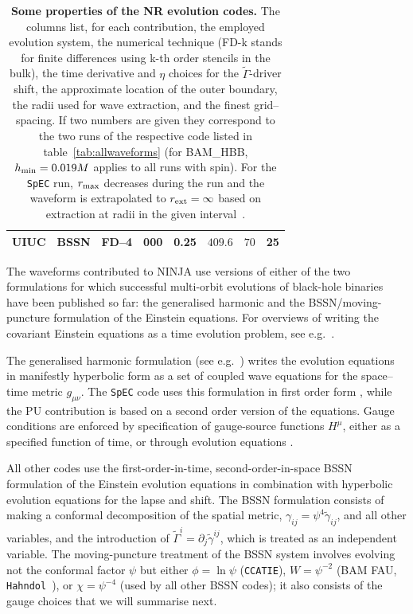 \begin{table}
\begin{center}
\begin{tabular}{|c|c|c|c|c|c|c|c|}
UIUC       & BSSN  &  FD--4         & 000 & 0.25      &  $409.6$    & $70$            & 25 \\ %

\hline
\end{tabular}
\end{center}
\caption{{\bf Some properties of the NR evolution codes.}  The columns
  list, for each contribution, the employed evolution system, the
  numerical technique (FD-k stands for finite differences using k-th
  order stencils in the bulk), the time derivative and $\eta$ choices
  for the $\tilde{\Gamma}$-driver shift, the approximate location of
  the outer boundary, the radii used for wave extraction, and the
  finest grid--spacing.  If two numbers are given they correspond to
the two runs of the respective code listed in table~\ref{tab:allwaveforms} (for BAM\_HBB, $h_{\rm min}=0.019M$ applies to all runs with spin).
For the {\tt SpEC} run, $r_{\rm max}$ decreases during the run and
the waveform is extrapolated to $r_{\rm ext}=\infty$ based
on extraction at radii in the given interval~\cite{Boyle:2007ft,Scheel:2008rj}. }
\label{tab:numparameters}
\end{table}

The waveforms contributed to NINJA use versions of either of the two
formulations for which successful multi-orbit evolutions of black-hole 
binaries have been published so far: the generalised harmonic and the
BSSN/moving-puncture formulation of the Einstein equations. For
overviews of writing the covariant Einstein equations as a time
evolution problem, see e.g.\ \cite{York1979,Wald84,Friedrich:2000qv}.

The generalised harmonic formulation (see e.g.\
\cite{Friedrich:2000qv}) writes the evolution equations in
manifestly hyperbolic form as a set of coupled wave equations for the
space--time metric $g_{\mu\nu}$. The {\tt SpEC} code uses this
formulation in first order form \cite{Lindblom:2005qh}, while the PU
contribution is based on a second order version of the equations.
Gauge conditions are enforced by specification of gauge-source
functions $H^\mu$, either as a specified function of time, or through
evolution equations
\cite{Pretorius:2005gq,Pretorius:2006tp,Boyle:2007ft,Scheel:2008rj}. 

All other codes use the first-order-in-time, second-order-in-space
BSSN formulation of the Einstein evolution equations
\cite{Nakamura:1987zz,Shibata:1995we,Baumgarte:1998te} in combination
with hyperbolic evolution equations for the lapse and shift. The BSSN
formulation consists of making a conformal decomposition of the
spatial metric, $\gamma_{ij} = \psi^4 \tilde{\gamma}_{ij}$, and all
other variables, and the introduction of $\tilde{\Gamma}^i =
\partial_j \tilde{\gamma}^{ij}$, which is treated as an independent
variable. The moving-puncture treatment of the BSSN system involves
evolving not the conformal factor $\psi$ but either $\phi = \ln\psi$
({\tt CCATIE}), $W = \psi^{-2}$ (BAM FAU, {\tt
Hahndol}~\cite{Marronetti:2007wz,Baker:2008mj}), or $\chi = \psi^{-4}$
(used by all other BSSN codes); it also consists of the gauge choices
that we will summarise next.

